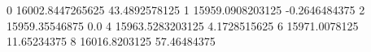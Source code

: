 0 16002.8447265625 43.4892578125
1 15959.0908203125 -0.2646484375
2 15959.35546875 0.0
4 15963.5283203125 4.1728515625
6 15971.0078125 11.65234375
8 16016.8203125 57.46484375
